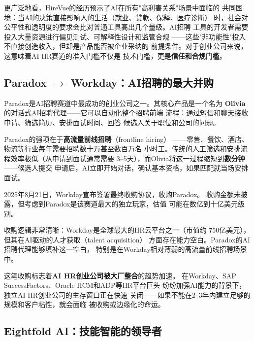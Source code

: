 更广泛地看，HireVue的经历预示了AI在所有"高利害关系"场景中面临的
共同困境：当AI的决策直接影响人的生活（就业、贷款、保释、医疗诊断）
时，社会对公平性和透明度的要求会比对普通工具高出几个量级。AI招聘
工具的开发者需要投入大量资源进行偏见测试、可解释性设计和监管合规
——这些"非功能性"投入不直接创造收入，但却是产品能否被企业采纳的
前提条件。对于创业公司来说，这意味着AI HR赛道的准入门槛不仅是
技术门槛，更是\textbf{信任和合规门槛}。

\subsection{Paradox $\to$ Workday：AI招聘的最大并购}
\label{subsec:paradox}

Paradox是AI招聘赛道中最成功的创业公司之一。其核心产品是一个名为
\textbf{Olivia}的对话式AI招聘代理——它可以自动化整个招聘前端
流程：通过短信和聊天接收申请、筛选简历、安排面试时间、回答
候选人关于职位和公司的问题。

Paradox的强项在于\textbf{高流量前线招聘}（frontline hiring）
——零售、餐饮、酒店、物流等行业每年需要招聘数十万甚至数百万名
小时工。传统的人工筛选和安排流程效率极低（从申请到面试通常需要
3--5天），而Olivia将这一过程缩短到\textbf{数分钟}——候选人提交
申请后，AI立即开始对话，确认基本资格，如果匹配就当场安排面试。

2025年8月21日，Workday宣布签署最终收购协议，收购Paradox。
收购金额未披露，但考虑到Paradox是该赛道最大的独立玩家，估值
可能在数亿到十亿美元级别。

收购逻辑非常清晰：Workday是全球最大的HR云平台之一（市值约
750亿美元），但其在AI驱动的人才获取（talent acquisition）
方面存在能力空白。Paradox的AI招聘代理能够填补这一空白，
特别是在Workday相对薄弱的高流量前线招聘场景中。

这笔收购标志着\textbf{AI HR创业公司被大厂整合}的趋势加速。
在Workday、SAP SuccessFactors、Oracle HCM和ADP等HR平台巨头
纷纷加强AI能力的背景下，独立AI HR创业公司的生存窗口正在快速
关闭——如果不能在2--3年内建立足够的规模和客户粘性，就会面临
被收购或边缘化的命运。

\subsection{Eightfold AI：技能智能的领导者}
\label{subsec:eightfold}

